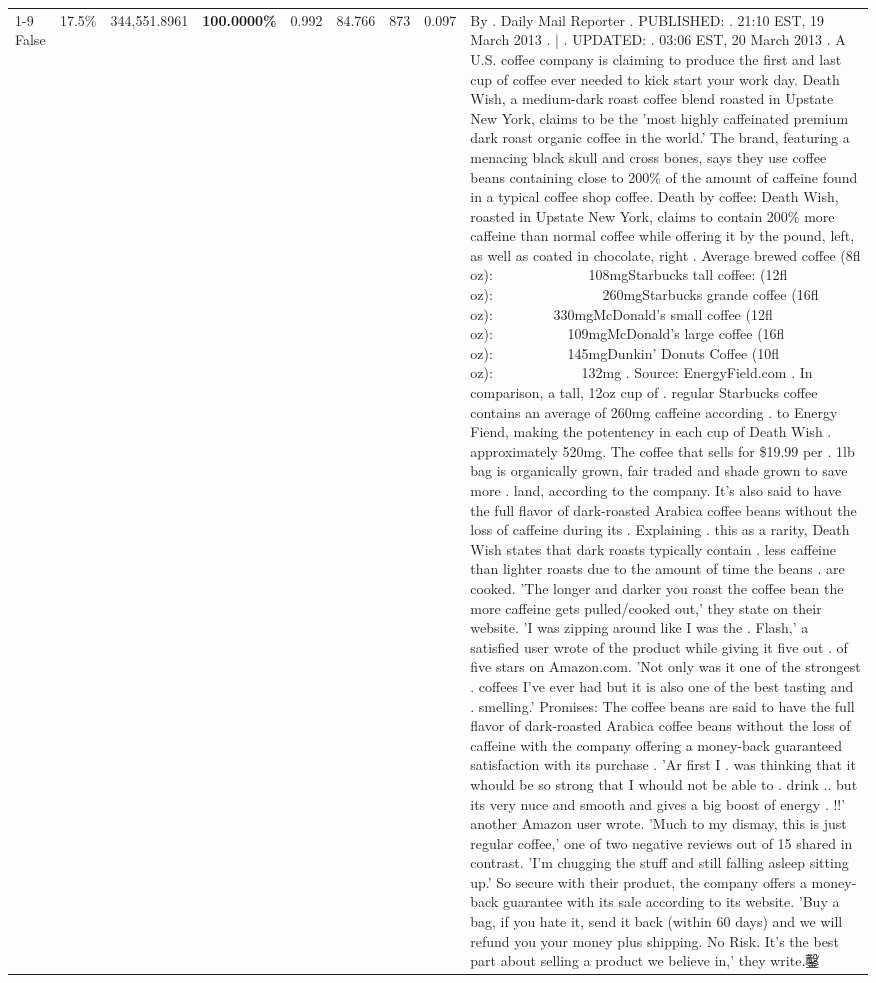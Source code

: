 \begin{table}[H]
{\begin{tabular}{lllrlllll}
\cline{1-9} \cline{2-9}
False & 17.5\% & 344,551.8961 & \bfseries \color{red} 100.0000\% & 0.992 & 84.766 & 873 & 0.097 & By . Daily Mail Reporter . PUBLISHED: . 21:10 EST, 19 March 2013 . | . UPDATED: . 03:06 EST, 20 March 2013 . A U.S. coffee company is claiming to produce the first and last cup of coffee ever needed to kick start your work day. Death Wish, a medium-dark roast coffee blend roasted in Upstate New York, claims to be the 'most highly caffeinated premium dark roast organic coffee in the world.' The brand, featuring a menacing black skull and cross bones, says they use coffee beans containing close to 200\% of the amount of caffeine found in a typical coffee shop coffee. Death by coffee: Death Wish, roasted in Upstate New York, claims to contain 200\% more caffeine than normal coffee while offering it by the pound, left, as well as coated in chocolate, right . Average brewed coffee (8fl oz):              108mgStarbucks tall coffee: (12fl oz):                260mgStarbucks grande coffee (16fl oz):         330mgMcDonald's small coffee (12fl oz):           109mgMcDonald's large coffee (16fl oz):           145mgDunkin' Donuts Coffee (10fl oz):             132mg . Source: EnergyField.com . In comparison, a tall, 12oz cup of . regular Starbucks coffee contains an average of 260mg caffeine according . to Energy Fiend, making the potentency in each cup of Death Wish . approximately 520mg. The coffee that sells for \$19.99 per . 1lb bag is organically grown, fair traded and shade grown to save more . land, according to the company. It's also said to have the full flavor of dark-roasted Arabica coffee beans without the loss of caffeine during its . Explaining . this as a rarity, Death Wish states that dark roasts typically contain . less caffeine than lighter roasts due to the amount of time the beans . are cooked. 'The longer and darker you roast the coffee bean the more caffeine gets pulled/cooked out,' they state on their website. 'I was zipping around like I was the . Flash,' a satisfied user wrote of the product while giving it five out . of five stars on Amazon.com. 'Not only was it one of the strongest . coffees I've ever had but it is also one of the best tasting and . smelling.’ Promises: The coffee beans are said to have the full flavor of dark-roasted Arabica coffee beans without the loss of caffeine with the company offering a money-back guaranteed satisfaction with its purchase . 'Ar first I . was thinking that it whould be so strong that I whould not be able to . drink .. but its very nuce and smooth and gives a big boost of energy . !!' another Amazon user wrote. 'Much to my dismay, this is just regular coffee,' one of two negative reviews out of 15 shared in contrast. 'I'm chugging the stuff and still falling asleep sitting up.' So secure with their product, the company offers a money-back guarantee with its sale according to its website. 'Buy a bag, if you hate it, send it back (within 60 days) and we will refund you your money plus shipping. No Risk. It’s the best part about selling a product we believe in,' they write.鑿 \\

\end{tabular}}
\end{table}
